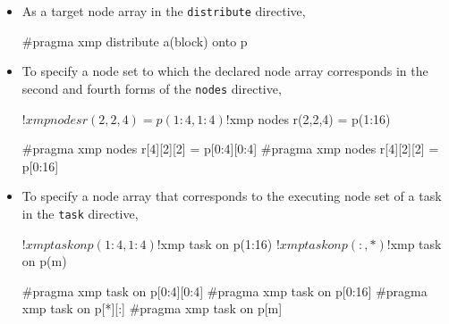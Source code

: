 \begin{itemize}
\item As a target node array in the {\tt distribute} directive,\\

\begin{minipage}{0.43\hsize}
\begin{center}
\end{center}
\end{minipage}
%
\begin{minipage}{0.54\hsize}
\begin{center}
\begin{XCexampleR}
#pragma xmp distribute a(block) onto p
\end{XCexampleR}
\end{center}
\end{minipage}

\item To specify a node set to which the declared node array corresponds
      in the second and fourth forms of the {\tt nodes} directive,\\

\begin{minipage}{0.43\hsize}
\begin{center}
\begin{XFexample}
!$xmp nodes r(2,2,4) = p(1:4,1:4)
!$xmp nodes r(2,2,4) = p(1:16)
\end{XFexample}
\end{center}
\end{minipage}
%
\begin{minipage}{0.54\hsize}
\begin{center}
\begin{XCexampleR}
#pragma xmp nodes r[4][2][2] = p[0:4][0:4]
#pragma xmp nodes r[4][2][2] = p[0:16]
\end{XCexampleR}
\end{center}
\end{minipage}

\item To specify a node array that corresponds to the executing node set
      of a task in the {\tt task} directive,

\begin{minipage}{0.43\hsize}
\begin{center}
\begin{XFexample}
!$xmp task on p(1:4,1:4)
!$xmp task on p(1:16)
!$xmp task on p(:,*)
!$xmp task on p(m)
\end{XFexample}
\end{center}
\end{minipage}
%
\begin{minipage}{0.54\hsize}
\begin{center}
\begin{XCexampleR}
#pragma xmp task on p[0:4][0:4]
#pragma xmp task on p[0:16]
#pragma xmp task on p[*][:]
#pragma xmp task on p[m]
\end{XCexampleR}
\end{center}
\end{minipage}


\end{itemize}
